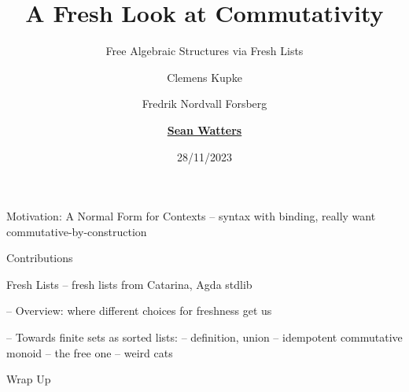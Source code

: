 \documentclass[handout]{beamer}
\title{A Fresh Look at Commutativity}
\subtitle{Free Algebraic Structures via Fresh Lists}
\author[S. Watters]{Clemens Kupke \and Fredrik Nordvall Forsberg \and \underline{\textbf{Sean Watters}}}
\institute{University of Strathclyde}
\date{28/11/2023}
\begin{document}
\begin{frame}
  \titlepage{}
\end{frame}


\begin{frame}{Motivation: A Normal Form for Contexts}
-- syntax with binding, really want commutative-by-construction
\end{frame}

\begin{frame}{Contributions}
\end{frame}

\begin{frame}{Fresh Lists}
-- fresh lists from Catarina, Agda stdlib
\end{frame}

-- Overview: where different choices for freshness get us

-- Towards finite sets as sorted lists:
-- definition, union
-- idempotent commutative monoid
-- the free one
-- weird cats

\begin{frame}{Wrap Up}
\end{frame}
\end{document}
